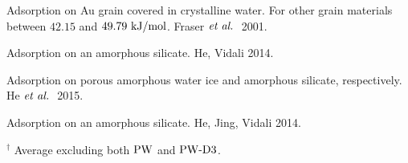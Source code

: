 \begin{table}[t]
\begin{adjustbox}{width=1.0\textwidth,center}
\begin{threeparttable}
    \begin{tablenotes}
    \item[\fakefna] Adsorption on Au grain covered in crystalline water.
    For other grain materials between $42.15$ and $49.79~\text {kJ/mol}$. Fraser $\emph{et al.}~$
    2001.\cite{Fraser2001}
    \item[\fakefnb] Adsorption on an amorphous silicate. He, Vidali 2014.
    \cite{HeVidali2014}
    \item[\fakefnc] Adsorption on porous amorphous water ice and amorphous
    silicate, respectively. He $\emph{et al.}~$ 2015. \cite{He2015}
    \item[\fakefnd] Adsorption on an amorphous silicate. He, Jing, Vidali
    2014. \cite{HeJingVidali2014}
    \item[$^\dagger$] Average excluding both $\text{PW}$ and $\text{PW}\text{-D3}$.
    \end{tablenotes}
    \end{threeparttable}
  \label{Tab:Ads:AdsForFuncs}%
  \end{adjustbox}
\end{table}%

